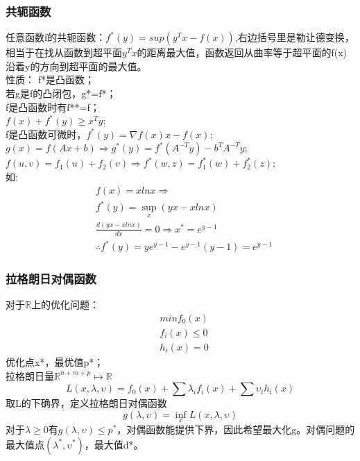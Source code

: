 \documentclass[UTF8]{../computerUniverse}
\begin{document}
\subsubsection{共轭函数}
任意函数f的共轭函数：$f^*(y)=sup(y^Tx-f(x))$,右边括号里是勒让德变换，相当于在找从函数到超平面$y^Tx$的距离最大值，函数返回从曲率等于超平面的f(x)沿着y的方向到超平面的最大值。\\
性质：
f*是凸函数；\\
若g是f的凸闭包，g*=f*；\\
f是凸函数时有f**=f；\\
$f(x)+f^*(y)\geqslant x^Ty$;\\
f是凸函数可微时，$f^*(y)=\nabla f(x)x-f(x)$;\\
$g(x)=f(Ax+b)\Rightarrow g^*(y)=f^*(A^{-T}y)-b^TA^{-T}y$;\\
$f(u,v)=f_1(u)+f_2(v)\Rightarrow f^*(w,z)=f_1^*(w)+f_2^*(z)$;\\
如:
\begin{equation}
    \begin{split}
    &f(x)=xlnx \Rightarrow \\
&f^*(y)=\sup_x(yx-xlnx)\\
&\frac{d(yx-xlnx)}{dx}=0\Rightarrow x^*=e^{y-1}\\
&\therefore f^*(y)=ye^{y-1}-e^{y-1}(y-1)=e^{y-1}
    \end{split}
\end{equation}


\subsubsection{拉格朗日对偶函数}
对于$\mathbb{R}$上的优化问题：
\begin{equation}
\begin{split}
&minf_0(x)\\
&f_i(x)\leqslant 0\\
&h_i(x)=0
\end{split}
\end{equation} 
优化点x*，最优值p*；\\
拉格朗日量$\mathbb R^{n+m+p}\mapsto \mathbb R$
\begin{equation}
L(x,\lambda, \upsilon)=f_0(x)+\sum \lambda_if_i(x)+\sum \upsilon _ih_i(x)
\end{equation}
 取L的下确界，定义拉格朗日对偶函数
 \begin{equation}
    g(\lambda, \upsilon)=\inf_x L(x,\lambda, \upsilon)
\end{equation}
对于$\lambda \geqslant 0$有$g(\lambda, \upsilon) \leqslant p^*$，对偶函数能提供下界，因此希望最大化g。对偶问题的最大值点$(\lambda^*,\upsilon ^*)$，最大值d*。
\end{document}
